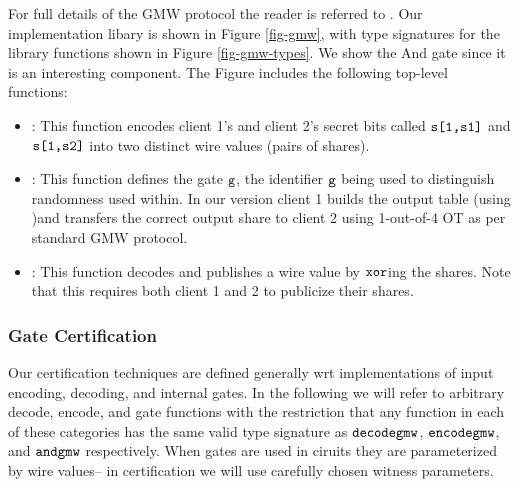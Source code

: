 For full details of the GMW protocol the reader is referred to
\cite{evans2018pragmatic}. Our implementation libary is shown in
Figure \ref{fig-gmw}, with type signatures for the library functions
shown in Figure \ref{fig-gmw-types}. We show the And gate since it is
an interesting component. The Figure includes the
following top-level functions:
\begin{itemize}
\item {}: This function encodes client 1's and client 2's
  secret bits called $\texttt{s[1,s1]}$ and $\texttt{s[1,s2]}$ into two
  distinct wire values (pairs of shares).
\item {}: This function defines the gate $\texttt{g}$, the
  identifier $\texttt{g}$ being used to distinguish randomness used
  within.  In our version client 1 builds the output table (using
  )and transfers the correct output share to client 2
  using 1-out-of-4 OT as per standard GMW protocol.
\item {}: This function decodes and publishes a wire value
  by $\texttt{xor}$ing the shares. Note that this requires both client 1
  and 2 to publicize their shares.
\end{itemize}

\subsubsection{Gate Certification}

Our certification techniques are defined generally wrt implementations
of input encoding, decoding, and internal gates. In the following we
will refer to arbitrary decode, encode, and gate functions with the
restriction that any function in each of these categories has the same
valid type signature as $\texttt{decodegmw}$, $\texttt{encodegmw}$, and
$\texttt{andgmw}$ respectively. When gates are used in ciruits they are
parameterized by wire values-- in certification we will use carefully
chosen witness parameters. 

